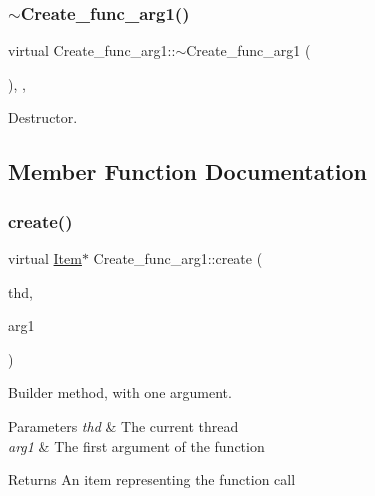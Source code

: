 \subsubsection{\texorpdfstring{$\sim$\+Create\+\_\+func\+\_\+arg1()}{~Create\_func\_arg1()}}
{\footnotesize\ttfamily virtual Create\+\_\+func\+\_\+arg1\+::$\sim$\+Create\+\_\+func\+\_\+arg1 (\begin{DoxyParamCaption}{ }\end{DoxyParamCaption})\hspace{0.3cm}{\ttfamily [inline]}, {\ttfamily [protected]}, {\ttfamily [virtual]}}

Destructor. 

\subsection{Member Function Documentation}
\mbox{\label{classCreate__func__arg1_a3e9a98f755cd82c3e762e334c955a8c9}} 
\subsubsection{\texorpdfstring{create()}{create()}}
{\footnotesize\ttfamily virtual \mbox{\hyperlink{classItem}{Item}}$\ast$ Create\+\_\+func\+\_\+arg1\+::create (\begin{DoxyParamCaption}\item[{T\+HD $\ast$}]{thd,  }\item[{\mbox{\hyperlink{classItem}{Item}} $\ast$}]{arg1 }\end{DoxyParamCaption})\hspace{0.3cm}{\ttfamily [pure virtual]}}

Builder method, with one argument. 
\begin{DoxyParams}{Parameters}
{\em thd} & The current thread \\
\hline
{\em arg1} & The first argument of the function \\
\hline
\end{DoxyParams}
\begin{DoxyReturn}{Returns}
An item representing the function call 
\end{DoxyReturn}


